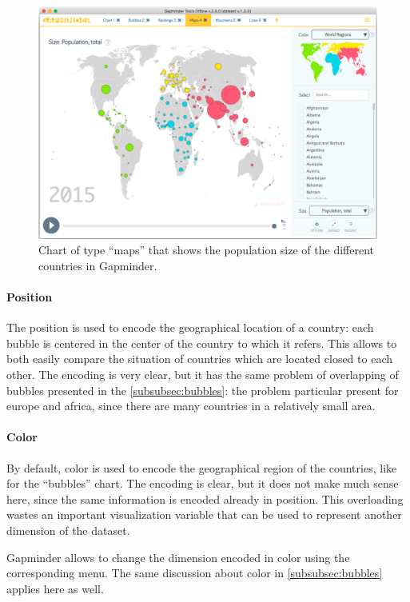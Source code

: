 \begin{figure}[h]
	\centering
	\includegraphics[width=0.95\columnwidth]{figures/maps}
	\caption{Chart of type ``maps'' that shows the population size of the different countries in Gapminder.}
	\label{fig:maps}
\end{figure}

\paragraph{Position}
The position is used to encode the geographical location of a country:
each bubble is centered in the center of the country to which it refers.
This allows to both easily compare the situation of countries which are located closed to each other.
The encoding is very clear, but it has the same problem of overlapping of bubbles presented in the \cref{subsubsec:bubbles}:
the problem particular present for europe and africa, since there are many countries in a relatively small area.

\paragraph{Color}
By default, color is used to encode the geographical region of the countries, like for the ``bubbles'' chart.
The encoding is clear, but it does not make much sense here, since the same information is encoded already in position.
This overloading wastes an important visualization variable that can be used to represent another dimension of the dataset.

Gapminder allows to change the dimension encoded in color using the corresponding menu.
The same discussion about color in \cref{subsubsec:bubbles} applies here as well.

